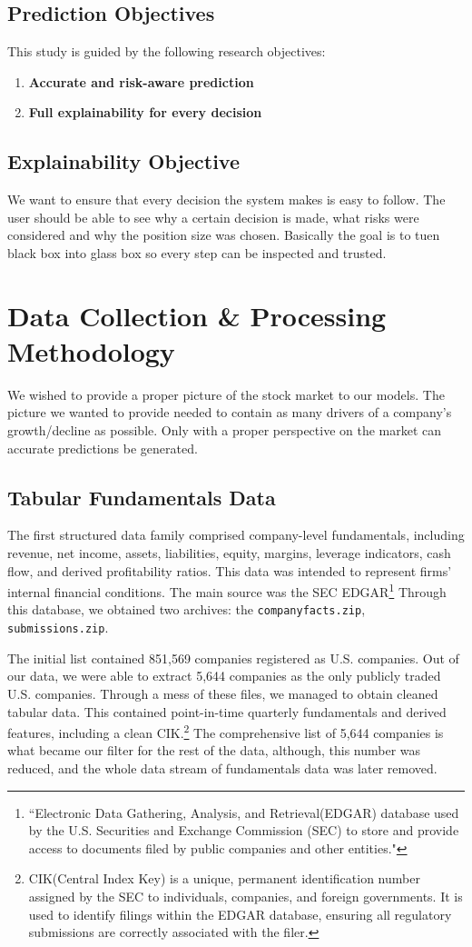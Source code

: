 \documentclass[conference]{IEEEtran}
\begin{document}
\subsection{Prediction Objectives}
This study is guided by the following research objectives:
\begin{enumerate}
    \item \textbf{Accurate and risk-aware prediction}
    \item \textbf{Full explainability for every decision}
\end{enumerate}

\subsection{Explainability Objective}
We want to ensure that every decision the system makes is easy to follow. The user should be able to see why a certain decision is made, what risks were considered and why the position size was chosen. Basically the goal is to tuen black box into glass box so every step can be inspected and trusted.

\section{Data Collection \& Processing Methodology}
We wished to provide a proper picture of the stock market to our models. The picture we wanted to provide needed to contain as many drivers of a company's growth/decline as possible. Only with a proper perspective on the market can accurate predictions be generated.  
\subsection{Tabular Fundamentals Data}
The first structured data family comprised company-level fundamentals, including revenue, net income, assets, liabilities, equity, margins, leverage indicators, cash flow, and derived profitability ratios. This data was intended to represent firms' internal financial conditions. The main source was the SEC EDGAR\footnote{``Electronic Data Gathering, Analysis, and Retrieval(EDGAR) database used by the U.S. Securities and Exchange Commission (SEC) to store and provide access to documents filed by public companies and other entities."\cite{SECedgarSite}} Through this database, we obtained two archives: the  \texttt{companyfacts.zip}, \texttt{submissions.zip}. 

The initial list contained 851,569 companies registered as U.S. companies. Out of our data, we were able to extract 5,644 companies as the only publicly traded U.S. companies. Through a mess of these files, we managed to obtain cleaned tabular data. This contained point-in-time quarterly fundamentals and derived features, including a clean CIK.\footnote{CIK(Central Index Key) is a unique, permanent identification number assigned by the SEC to individuals, companies, and foreign governments. It is used to identify filings within the EDGAR database, ensuring all regulatory submissions are correctly associated with the filer.
} The comprehensive list of 5,644 companies is what became our filter for the rest of the data, although, this number was reduced, and the whole data stream of fundamentals data was later removed. 
\end{document}
